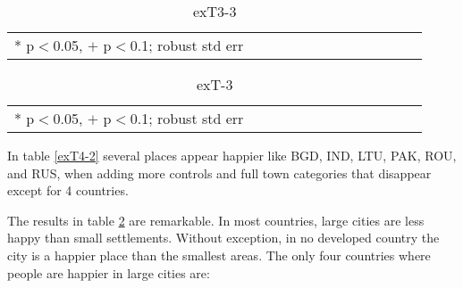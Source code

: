 \documentclass[10pt, letterpaper]{article}
\begin{document}
\begin{spacing}{1.4}
\begin{spacing}{.9} \begin{table}[H]\centering  \label{exT3-3} \begin{scriptsize} \begin{tabular}{p{1.8in}p{.5in}p{.5in}p{.5in}p{.5in}p{.5in}p{.5in}p{.5in}p{.5in}p{.5in}p{.5 in}p{.5in}p{.5 in}}\hline  \hline   * p$<$0.05, $+$ p$<$0.1; robust std err \end{tabular}\end{scriptsize}\caption{exT3-3}\end{table} \end{spacing}

\begin{spacing}{.9} \begin{table}[H]\centering  \label{exT-3} \begin{scriptsize} \begin{tabular}{p{1.8in}p{.5in}p{.5in}p{.5in}p{.5in}p{.5in}p{.5in}p{.5in}p{.5in}p{.5in}p{.5 in}p{.5in}p{.5 in}}\hline  \hline   * p$<$0.05, $+$ p$<$0.1; robust std err \end{tabular}\end{scriptsize}\caption{exT-3}\end{table} \end{spacing}








In table \ref{exT4-2} several places appear happier like BGD, IND, LTU, PAK, ROU, and RUS, when adding more controls and full town categories that disappear except for 4 countries.


The results in table \ref{exT-3} are remarkable. In most countries, large cities are less happy than small settlements. Without exception, in no developed country the city is a happier place than the smallest areas. The only four countries where people are happier in large cities are: 

%         


\end{spacing}
\end{document}
